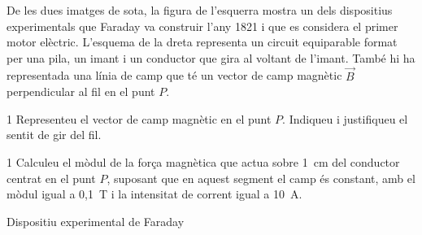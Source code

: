 De les dues imatges de sota, la figura de l'esquerra mostra un dels dispositius experimentals que Faraday va construir l'any 1821 i que es considera el primer motor elèctric. L'esquema de la dreta representa un circuit equiparable format per una pila, un imant i un conductor que gira al voltant de l'imant. També hi ha representada una línia de camp que té un vector de camp magnètic $\vec{B}$ perpendicular al fil en el punt $P$.

\begin{apartat}{1}
Representeu el vector de camp magnètic en el punt $P$. Indiqueu i justifiqueu el sentit de gir del fil.
\end{apartat}

\begin{apartat}{1}
Calculeu el mòdul de la força magnètica que actua sobre 1~cm del conductor centrat en el punt $P$, suposant que en aquest segment el camp és constant, amb el mòdul igual a 0,1~T i la intensitat de corrent igual a 10~A.
\end{apartat}

\begin{center}
\begin{minipage}[b]{0.46\linewidth}
{\centering Dispositiu experimental de Faraday\par}
\end{minipage}\hspace{0.04\linewidth}%
\begin{minipage}[b]{0.34\linewidth}
\end{minipage}
\end{center}
